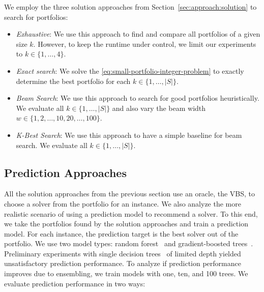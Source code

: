 \documentclass[conference]{IEEEtran}
\begin{document}
We employ the three solution approaches from Section~\ref{sec:approach:solution} to search for portfolios:

\begin{itemize}
	\item \emph{Exhaustive}:
	We use this approach to find and compare all portfolios of a given size $k$.
	However, to keep the runtime under control, we limit our experiments to $k \in \{1, \dots, 4\}$.
	\item \emph{Exact search}:
	We solve the \ref{eq:small-portfolio-integer-problem} to exactly determine the best portfolio for each $k \in \{1, \dots, |S|\}$.
	\item \emph{Beam Search}:
	We use this approach to search for good portfolios heuristically.
	We evaluate all $k \in \{1, \dots, |S|\}$ and also vary the beam width $w \in \{1, 2, \dots, 10, 20, \dots, 100\}$.
	\item \emph{K-Best Search}:
	We use this approach to have a simple baseline for beam search.
	We evaluate all $k \in \{1, \dots, |S|\}$.
\end{itemize}

\subsection{Prediction Approaches}

All the solution approaches from the previous section use an oracle, the VBS, to choose a solver from the portfolio for an instance.
We also analyze the more realistic scenario of using a prediction model to recommend a solver.
To this end, we take the portfolios found by the solution approaches and train a prediction model.
For each instance, the prediction target is the best solver out of the portfolio.
We use two model types: random forest~\cite{breiman2001random} and gradient-boosted trees~\cite{friedman2001greedy}.
Preliminary experiments with single decision trees~\cite{breiman1984classification} of limited depth yielded unsatisfactory prediction performance.
To analyze if prediction performance improves due to ensembling, we train models with one, ten, and 100 trees.
We evaluate prediction performance in two ways:
\end{document}

